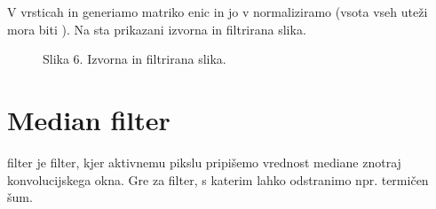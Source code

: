 \documentclass[letterpaper,10pt,english]{sphinxmanual}
\begin{document}
\begin{sphinxVerbatim}[commandchars=\\\{\}]
 \PYG{p}{[}          \PYG{p}{]}
 \PYG{p}{[}          \PYG{p}{]}\PYG{p}{]}
\end{sphinxVerbatim}

\sphinxAtStartPar
V vrsticah  in  generiamo  matriko enic in jo v normaliziramo (vsota vseh uteži mora biti ). Na  sta prikazani izvorna in filtrirana slika.

\begin{figure}[htbp]
\centering
\capstart

\noindent{}
\caption{Slika 6. Izvorna in filtrirana slika.}\label{\detokenize{uvod_py_opencv:id7}}\end{figure}


\section{Median filter}
\label{\detokenize{uvod_py_opencv:median-filter}}
\sphinxAtStartPar
{} filter je filter, kjer aktivnemu pikslu pripišemo vrednost mediane znotraj konvolucijskega okna. Gre za filter, s katerim lahko odstranimo npr. termičen šum.
\end{document}
